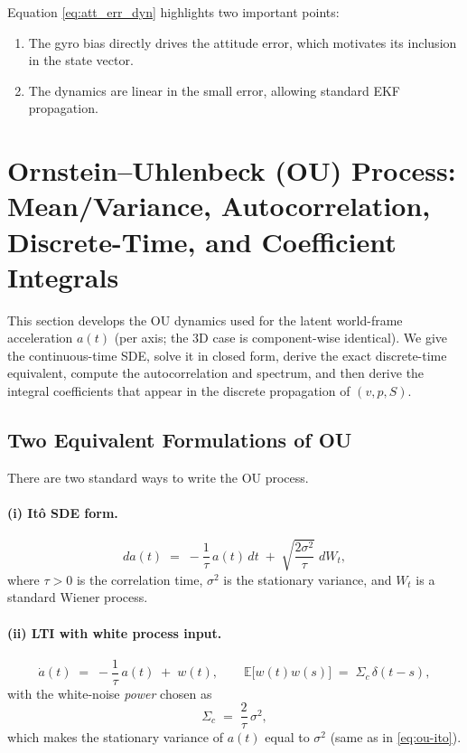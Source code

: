 \documentclass[11pt]{article}
\begin{document}
Equation \eqref{eq:att_err_dyn} highlights two important points:
\begin{enumerate}
\item The gyro bias directly drives the attitude error, which motivates its inclusion in the state vector.
\item The dynamics are linear in the small error, allowing standard EKF propagation.
\end{enumerate}

\section{Ornstein--Uhlenbeck (OU) Process: Mean/Variance, Autocorrelation, Discrete-Time, and Coefficient Integrals}
\label{sec:ou-detailed}

This section develops the OU dynamics used for the latent world-frame acceleration $a(t)$
(per axis; the 3D case is component-wise identical). We give the continuous-time SDE,
solve it in closed form, derive the exact discrete-time equivalent, compute the
autocorrelation and spectrum, and then derive the integral coefficients that appear
in the discrete propagation of $(v,p,S)$.

\subsection{Two Equivalent Formulations of OU}
There are two standard ways to write the OU process.

\paragraph{(i) It\^o SDE form.}
\begin{equation}
da(t) \;=\; -\frac{1}{\tau}\,a(t)\,dt \;+\; \sqrt{\frac{2\sigma^2}{\tau}}\; dW_t,
\label{eq:ou-ito}
\end{equation}
where $\tau>0$ is the correlation time, $\sigma^2$ is the stationary variance, and $W_t$
is a standard Wiener process.

\paragraph{(ii) LTI with white process input.}
\begin{equation}
\dot a(t) \;=\; -\frac{1}{\tau}\,a(t) \;+\; w(t),\qquad
\mathbb{E}\big[w(t)w(s)\big] \;=\; \Sigma_c\,\delta(t-s),
\label{eq:ou-lti}
\end{equation}
with the white-noise \emph{power} chosen as
\begin{equation}
\Sigma_c \;=\; \frac{2}{\tau}\,\sigma^2,
\label{eq:ou-sigmapower}
\end{equation}
which makes the stationary variance of $a(t)$ equal to $\sigma^2$ (same as in \eqref{eq:ou-ito}).
\end{document}
